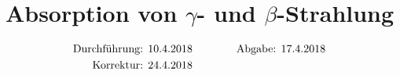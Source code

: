 

\subject{V704}
\title{Absorption von \texorpdfstring{$\gamma$}{gamma}- und \texorpdfstring{$\beta$}{beta}-Strahlung}

\date{
  \begin{align}
    \text{Durchführung: } & \text{10.4.2018} & \hspace{3em} & \text{Abgabe: 17.4.2018} \notag
\\  \text{Korrektur: } & \text{24.4.2018} & \hspace {3em} & \notag
  \end{align}
}




\maketitle
\thispagestyle{empty}
\tableofcontents
\newpage






\nocite{*}
\printbibliography{}



